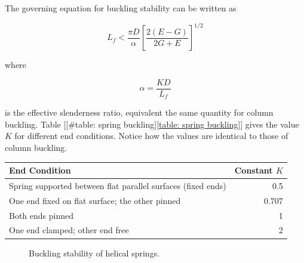 \documentclass[a4paper,openany,12pt]{book}
\begin{document}
{{The governing equation for buckling stability can be written as

$$L_f < \frac{\pi D}{\alpha} \left[ \frac{2(E-G)}{2G+E} \right]^{1/2}$$

where

$$\alpha = \frac{KD}{L_f}$$

is the effective slenderness ratio, equivalent the same quantity for
column buckling. Table
[[\#table: spring buckling]\ref{table: spring buckling}] gives the value
\(K\) for different end conditions. Notice how the values are identical to
those of column buckling.


\begin{center}
\label{table: spring buckling}
\begin{tabular}{lr}
\toprule
End Condition & Constant \(K\)\\
\midrule
Spring supported between flat parallel surfaces (fixed ends) & 0.5\\
One end fixed on flat surface; the other pinned & 0.707\\
Both ends pinned & 1\\
One end clamped; other end free & 2\\
\bottomrule
\end{tabular}
\end{center}

\begin{figure}[h]
  \centering
  \caption{Buckling stability of helical springs.}
  \label{fig: spring buckling}
\end{figure}

}}
\end{document}
